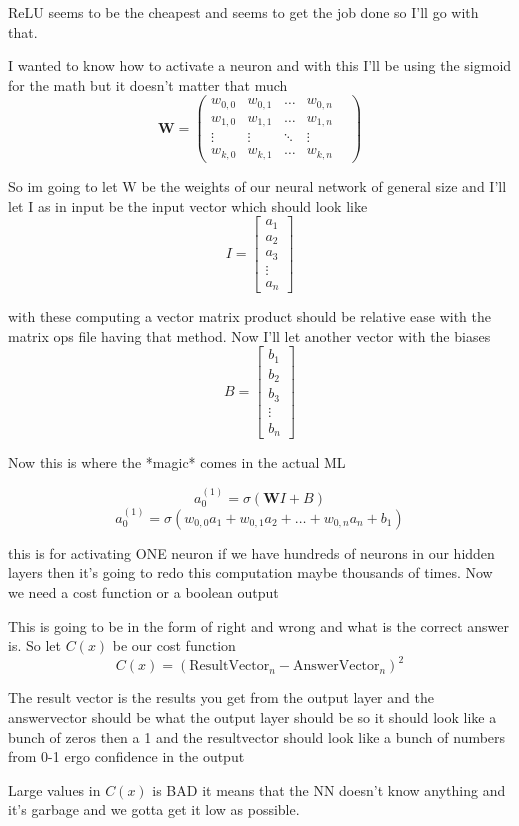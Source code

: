 \documentclass{article}
\begin{document}
\par{ReLU seems to be the cheapest and seems to get the job done so I'll go with that. }
\par{I wanted to know how to activate a neuron and with this I'll be using the sigmoid for the math but it doesn't matter that much}
$$\mathbf{W} = \begin{pmatrix}
    w_{0,0} & w_{0,1} & \dots & w_{0,n} \\
    w_{1,0} & w_{1,1} & \dots & w_{1,n} \\
    \vdots  & \vdots & \ddots & \vdots \\
    w_{k,0} & w_{k,1} & \dots & w_{k,n} &  
\end{pmatrix}$$
\par{So im going to let W be the weights of our neural network of general size and I'll let I as in input be the input vector which should look like}
$$I = \begin{bmatrix}
    a_{1} \\
    a_{2} \\
    a_{3} \\
    \vdots \\
    a_{n}
\end{bmatrix}$$
\par{with these computing a vector matrix product should be relative ease with the matrix ops file having that method.
Now I'll let another vector with the biases}
$$
B = \begin{bmatrix}
    b_{1} \\
    b_{2} \\
    b_{3} \\
    \vdots \\
    b_{n}
\end{bmatrix}
$$
\par{Now this is where the *magic* comes in the actual ML}

$$a_0^{(1)}=\sigma(\mathbf{W}I+B)$$
$$ a_0^{(1)} = \sigma(w_{0,0}a_{1} + w_{0,1}a_{2} + \dots + w_{0,n}a_{n} +b_{1})$$
\par{this is for activating ONE neuron if we have hundreds of neurons in our hidden layers
then it's going to redo this computation maybe thousands of times. Now we need a cost function or a boolean output}
\\
\par{This is going to be in the form of right and wrong and what is the correct answer is. So let $C(x)$ be our cost function}
$$C(x) = (\text{ResultVector}_n - \text{AnswerVector}_n)^2$$
\par{The result vector is the results you get from the output layer and the answervector should be what the output layer should be so it should look like
a bunch of zeros then a 1 and the resultvector should look like a bunch of numbers from 0-1 ergo confidence in the output}
\\
\par{Large values in $C(x)$ is BAD it means that the NN doesn't know anything and it's garbage and we gotta get it low as possible.}
\end{document}
